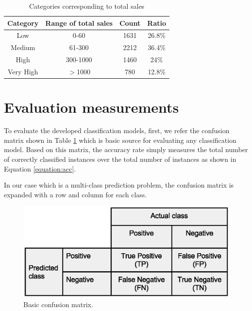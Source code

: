 \documentclass{llncs}
\begin{document}
\begin{table}[ht]
\caption{Categories corresponding to total sales }
\centering{}%
\begin{tabular}{|c|c|c|c|}
\hline 
Category & Range of total sales & Count & Ratio\tabularnewline
\hline 
\hline 
Low & 0-60 & 1631 & 26.8\%\tabularnewline
\hline 
Medium & 61-300 & 2212 & 36.4\%\tabularnewline
\hline 
High & 300-1000 & 1460 & 24\%\tabularnewline
\hline 
Very High & $>$1000 & 780 & 12.8\%\tabularnewline
\hline 
\end{tabular}
\label{table:freq}
\end{table}



\section{Evaluation measurements}




To evaluate the developed classification models, first, we refer the confusion matrix shown in Table \ref{fig:confusionmatrix} which is basic source for evaluating any classification model. Based on this matrix, the accuracy rate simply measures the total number of correctly classified instances over the total number of instances as shown in Equation \ref{equation:acc}.

In our case which is a multi-class prediction problem, the confusion matrix is expanded with a row and column for each class. 








\begin{figure}[ht]
\begin{center}
\includegraphics[scale=0.50]{confusion-matrix}
\end{center}
\caption{Basic confusion matrix.}
\label{fig:confusionmatrix}
\end{figure}
\end{document}
